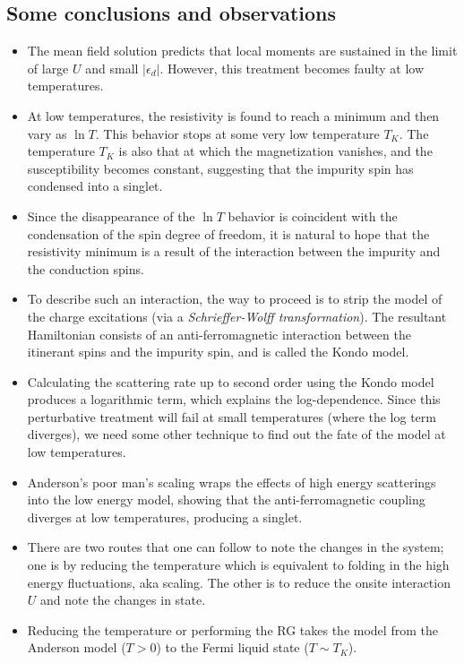 \documentclass[twoside,11pt]{report}
\numberwithin{equation}{section}
\begin{document}
\subsection{Some conclusions and observations}
\begin{itemize}
	\item The mean field solution predicts that local moments are sustained in the limit of large \(U\) and small \(|\epsilon_d|\). However, this treatment becomes faulty at low temperatures.
	\item At low temperatures, the resistivity is found to reach a minimum and then vary as \(\ln T\). This behavior stops at some very low temperature \(T_K\). The temperature \(T_K\) is also that at which the magnetization vanishes, and the susceptibility becomes constant, suggesting that the impurity spin has condensed into a singlet.
	\item Since the disappearance of the \(\ln T\) behavior is coincident with the condensation of the spin degree of freedom, it is natural to hope that the resistivity minimum is a result of the interaction between the impurity and the conduction spins.
    \item To describe such an interaction, the way to proceed is to strip the model of the charge excitations (via a \textit{Schrieffer-Wolff transformation}).
The resultant Hamiltonian consists of an anti-ferromagnetic interaction between the itinerant spins and the impurity spin, and is called the Kondo model.
    \item Calculating the scattering rate up to second order using the Kondo model produces a logarithmic term, which explains the log-dependence. Since this perturbative treatment will fail at small temperatures (where the log term diverges), we need some other technique to find out the fate of the model at low temperatures.
    \item Anderson's poor man's scaling wraps the effects of high energy scatterings into the low energy model, showing that the anti-ferromagnetic coupling diverges at low temperatures, producing a singlet.
    \item There are two routes that one can follow to note the changes in the system; one is by reducing the temperature which is equivalent to folding in the high energy fluctuations, aka scaling.
	    The other is to reduce the onsite interaction \(U\) and note the changes in state.
    \item Reducing the temperature or performing the RG takes the model from the Anderson model (\(T>0\)) to the Fermi liquid state (\(T \sim T_K\)).

\end{itemize}
\end{document}
